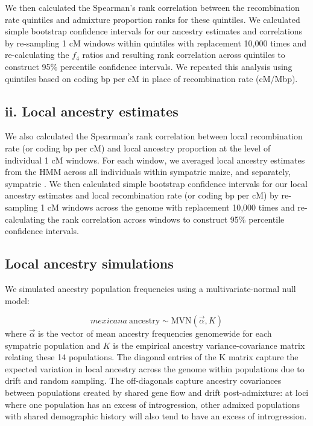 We then calculated the Spearman's rank correlation between the recombination rate quintiles and admixture proportion ranks for these quintiles. 
We calculated simple bootstrap confidence intervals for our ancestry estimates and correlations by re-sampling 1 cM windows within quintiles with replacement 10,000 times and re-calculating the $f_4$ ratios and resulting rank correlation across quintiles to construct 95\% percentile confidence intervals. 
We repeated this analysis using quintiles based on coding bp per cM in place of recombination rate (cM/Mbp).

\subsection*{ii. Local ancestry estimates}
We also calculated the Spearman's rank correlation between local recombination rate (or coding bp per cM) and local ancestry proportion at the level of individual 1 cM windows. 
For each window, we averaged local ancestry estimates from the HMM across all individuals within sympatric maize, and separately, sympatric \mexicana. 
We then calculated simple bootstrap confidence intervals for our local ancestry estimates and local recombination rate (or coding bp per cM) by re-sampling 1 cM windows across the genome with replacement 10,000 times and re-calculating the rank correlation across windows to construct 95\% percentile confidence intervals.


\subsection*{Local ancestry simulations}


We simulated \mexicana ancestry population frequencies using a multivariate-normal null model:

$$mexicana\ \text{ancestry} \sim \text{MVN}(\vec{\alpha}, K)$$
where $\vec{\alpha}$ is the vector of mean \mexicana ancestry frequencies genomewide for each sympatric population and $K$ is the empirical ancestry variance-covariance matrix relating these 14 populations. 
The diagonal entries of the K matrix capture the expected variation in local ancestry across the genome within populations due to drift and random sampling. 
The off-diagonals capture ancestry covariances between populations created by shared gene flow and drift post-admixture: at loci where one population has an excess of introgression, other admixed populations with shared demographic history will also tend to have an excess of introgression.


